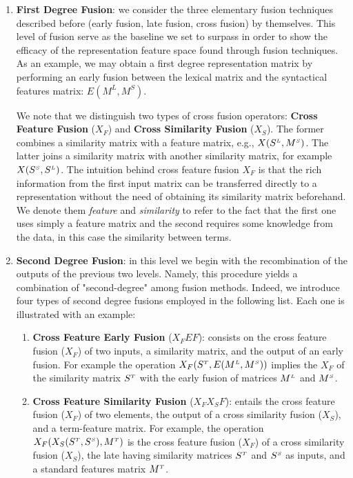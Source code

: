  \begin{enumerate}
\item \textbf{First Degree Fusion}: we  consider the  three elementary fusion techniques described before (early fusion, late fusion, cross fusion) by themselves.  This level of fusion serve as the baseline we set to surpass in order to show the efficacy of the representation feature space found through fusion techniques.
As an example, we may obtain a first degree representation matrix by performing an early fusion between the lexical matrix and the syntactical features matrix: $E(M^{L}, M^{S})$. 

We note that we distinguish two types of cross fusion operators: \textbf{Cross Feature Fusion} ($X_F$) and \textbf{Cross Similarity Fusion} ($X_S$). The former combines a similarity matrix with a feature matrix, e.g., $X(S^{\scriptscriptstyle L}, M^{\scriptscriptstyle S})$. The latter joins a similarity matrix with another similarity matrix, for example $X(S^{\scriptscriptstyle S}, S^{\scriptscriptstyle L})$. %
The intuition behind cross feature fusion $X_F$ is that the rich information from the first input matrix can be transferred directly to a representation without the need of obtaining its similarity matrix beforehand. We denote them \textit{feature} and \textit{similarity} to refer to the fact that the first one uses simply a feature matrix and the second requires some knowledge from the data, in this case the similarity between terms.

\item \textbf{Second Degree Fusion}: in this level we  begin with the recombination of the outputs of the previous two levels. Namely, this procedure  yields a combination of "second-degree" among fusion methods. Indeed, we introduce four types of second degree fusions employed in the following list. Each one is illustrated with an example:


\begin{enumerate}

\item \textbf{Cross Feature Early Fusion} ($X_FEF$): consists on the cross feature fusion ($X_F$) of two inputs, a similarity matrix, and the output of an early fusion. For example the operation $X_F(S^{\scriptscriptstyle T}, E(M^{\scriptscriptstyle L}, M^{\scriptscriptstyle S}))$ implies the $X_F$ of the similarity matrix $S^{\scriptscriptstyle T}$ with the early fusion of matrices $M^{\scriptscriptstyle L}$ and $M^{\scriptscriptstyle S}$.

\item \textbf{Cross Feature Similarity Fusion} ($X_FX_SF$): entails the cross feature fusion ($X_F$) of two elements, the output of a cross similarity fusion ($X_S$), and a term-feature matrix. For example, the operation $X_F(X_S(S^{\scriptscriptstyle T}, S^{\scriptscriptstyle S}), M^{\scriptscriptstyle T})$ is the cross feature fusion ($X_F$) of a cross similarity fusion ($X_S$), the late having similarity matrices $S^{\scriptscriptstyle T}$ and $S^{\scriptscriptstyle S}$ as inputs, and a standard features matrix $M^{\scriptscriptstyle T}$.


\end{enumerate}
\end{enumerate}
